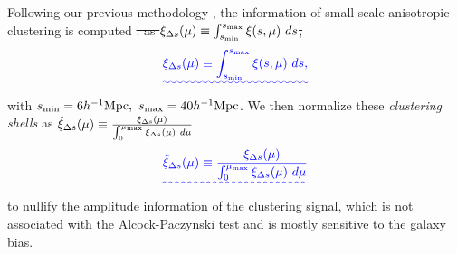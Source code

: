 \documentclass[iop]{emulateapj}
\providecommand{\DIFadd}[1]{{\protect\color{blue}\uwave{#1}}} %
\providecommand{\DIFdel}[1]{{\protect\color{red}\sout{#1}}}                      %
\providecommand{\DIFaddbegin}{} %
\providecommand{\DIFaddend}{} %
\providecommand{\DIFdelbegin}{} %
\providecommand{\DIFdelend}{} %
\begin{document}
Following our previous methodology \citep{Li2016}, the information of small-scale anisotropic clustering is computed \DIFdelbegin \DIFdel{.
as 
$\xi_{\Delta s} (\mu) \equiv \int_{s_{\rm min}}^{s_{\rm max}} \xi (s,\mu)\ ds$, 
}\DIFdelend \DIFaddbegin \DIFadd{as 
}\begin{equation}
\DIFadd{\xi_{\Delta s} (\mu) \equiv \int_{s_{\rm min}}^{s_{\rm max}} \xi (s,\mu)\ ds,
}\end{equation}
\DIFaddend with $s_{\rm min}=6 h^{-1} {\rm Mpc},\ s_{\rm max}=40 h^{-1} {\rm Mpc}$.
We then normalize these {\em clustering shells} as 
\DIFdelbegin \DIFdel{$\hat\xi_{\Delta s}(\mu) \equiv \frac{\xi_{\Delta s}(\mu)}{\int_{0}^{\mu_{\rm max}}\xi_{\Delta s}(\mu)\ d\mu}$
}\DIFdelend \DIFaddbegin \begin{equation}
\DIFadd{\hat\xi_{\Delta s}(\mu) \equiv \frac{\xi_{\Delta s}(\mu)}{\int_{0}^{\mu_{\rm max}}\xi_{\Delta s}(\mu)\ d\mu}
}\end{equation}
\DIFaddend to nullify the amplitude information of the clustering signal, 
which is not associated with the Alcock-Paczynski test and is mostly sensitive to the galaxy bias.
\DIFdelbegin %
\end{document}
